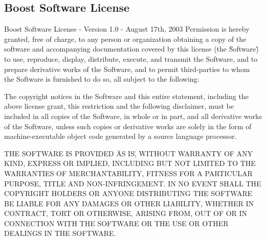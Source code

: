 \documentclass{scrartcl}
\begin{document}
\begin{appendix}
\section{Boost Software License}
Boost Software License - Version 1.0 - August 17th, 2003\newline
\newline
Permission is hereby granted, free of charge, to any person or organization
obtaining a copy of the software and accompanying documentation covered by
this license (the \"Software\") to use, reproduce, display, distribute,
execute, and transmit the Software, and to prepare derivative works of the
Software, and to permit third-parties to whom the Software is furnished to
do so, all subject to the following:\newline\newline

The copyright notices in the Software and this entire statement, including
the above license grant, this restriction and the following disclaimer,
must be included in all copies of the Software, in whole or in part, and
all derivative works of the Software, unless such copies or derivative
works are solely in the form of machine-executable object code generated by
a source language processor.\newline\newline

THE SOFTWARE IS PROVIDED \"AS IS\", WITHOUT WARRANTY OF ANY KIND, EXPRESS OR
IMPLIED, INCLUDING BUT NOT LIMITED TO THE WARRANTIES OF MERCHANTABILITY,
FITNESS FOR A PARTICULAR PURPOSE, TITLE AND NON-INFRINGEMENT. IN NO EVENT
SHALL THE COPYRIGHT HOLDERS OR ANYONE DISTRIBUTING THE SOFTWARE BE LIABLE
FOR ANY DAMAGES OR OTHER LIABILITY, WHETHER IN CONTRACT, TORT OR OTHERWISE,
ARISING FROM, OUT OF OR IN CONNECTION WITH THE SOFTWARE OR THE USE OR OTHER
DEALINGS IN THE SOFTWARE.
\end{appendix}
\end{document}
